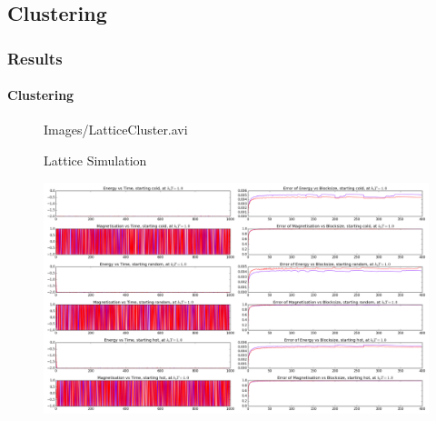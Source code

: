 \subsection{Clustering}
\begin{frame}
\frametitle{Results}
\framesubtitle{Clustering}
	\begin{figure}
	\centering
	{Images/LatticeCluster.avi}
	\caption{Lattice Simulation}
	\end{figure}
\end{frame}
\begin{frame}
	\begin{figure}
		\centering
		\includegraphics[width=1.0\textwidth]{Images/C1}
	\end{figure}
\end{frame}
